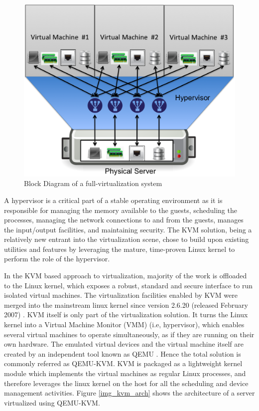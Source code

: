 \begin{figure}[htbp]
\centering
\includegraphics[width=120mm]{full-virt.png}
\caption{Block Diagram of a full-virtualization system}
\label{img_full_virt}
\end{figure}
A hypervisor is a critical part of a stable operating environment as it is responsible for managing the memory available to the guests, scheduling the processes, managing the network connections to and from the guests, manages the input/output facilities, and maintaining security. The KVM solution, being a relatively new entrant into the virtualization scene, chose to build upon existing utilities and features by leveraging the mature, time-proven Linux kernel to perform the role of the hypervisor. 

In the KVM based approach to virtualization, majority of the work is offloaded to the Linux kernel, which exposes a robust, standard and secure interface to run isolated virtual machines. The virtualization facilities enabled by KVM were merged into the mainstream linux kernel since version 2.6.20 (released February 2007) \cite{kvm_linux_kernel}. KVM itself is only part of the virtualization solution. It turns the Linux kernel into a Virtual Machine Monitor (VMM) (i.e, hypervisor), which enables several virtual machines to operate simultaneously, as if they are running on their own hardware. The emulated virtual devices and the virtual machine itself are created by an independent tool known as QEMU \cite{qemu}. Hence the total solution is commonly referred as QEMU-KVM. KVM is packaged as a lightweight kernel module which implements the virtual machines as regular Linux processes, and therefore leverages the linux kernel on the host for all the scheduling and device management activities. 
Figure \ref{img_kvm_arch} shows the architecture of a server virtualized using QEMU-KVM.

